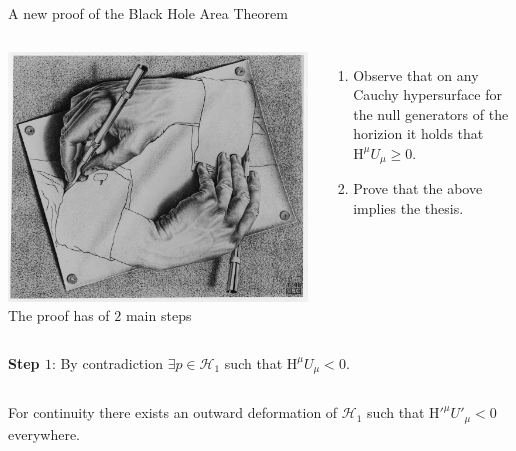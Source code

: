 \documentclass[handout]{beamer}
\begin{document}
	\begin{frame}{A new proof of the Black Hole Area Theorem}
		\begin{columns}
			\includegraphics[scale=0.15]{Immagini/escher.jpg}
			The proof has of \(2\) main steps
			\begin{enumerate}
				\item Observe that on any Cauchy hypersurface for the null generators of the horizion it holds that \(\mathrm{H}^{\mu}U_{\mu} \ge 0\).
				\item Prove that the above implies the thesis.
			\end{enumerate}
		\end{columns}
		\vskip 7pt
		\textbf{Step \(1\)}: By contradiction \(\exists p\in \mathscr{H}_1\) such that \(\mathrm{H}^{\mu}U_{\mu} < 0\).
		\vskip 7pt
		\begin{columns}
			\column{0.6\textwidth}
			For continuity there exists an outward deformation of \(\mathscr{H}_1\) such that \(\mathrm{H}'^{\mu}U'_{\mu} < 0\) everywhere.


\end{columns}
\end{frame}
\end{document}
